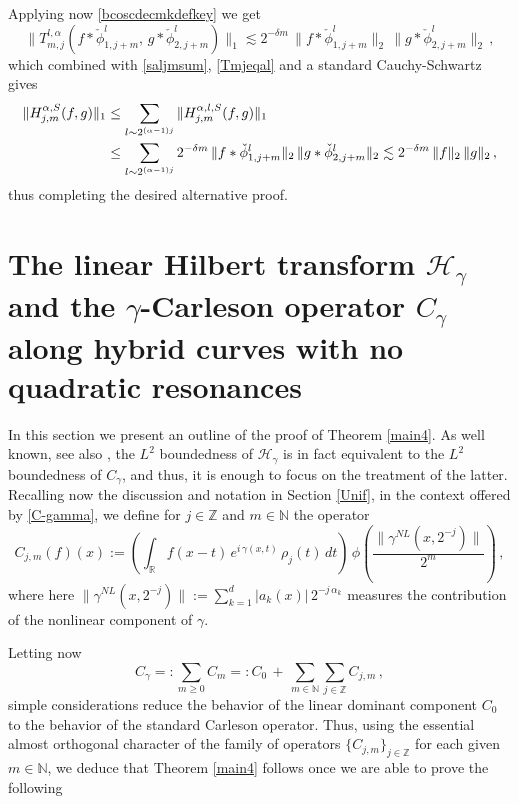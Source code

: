 \documentclass[a4paper,reqno]{amsart}
\numberwithin{equation}{section}
\theoremstyle{definition}
\newcommand{\R}{\mathbb{R}}
\newcommand{\Z}{\mathbb{Z}}
\newcommand{\N}{\mathbb{N}}
\def\a{\alpha}
\def\g{\gamma}
\def\H{\mathcal{H}}
\def\d{\delta}
\begin{document}
Applying now \eqref{bcoscdecmkdefkey} we get
\begin{equation}\label{Tmjeq1al}
\big\|T_{m,j}^{l,\a}(f*\check{\phi}_{1,j+m}^l,\,g*\check{\phi}_{2,j+m}^l)\big\|_1\lesssim 2^{-\d m}\,\|f*\check{\phi}_{1,j+m}^l\|_2\,\|g*\check{\phi}_{2,j+m}^l\|_2\,,
\end{equation}	
which combined with \eqref{saljmsum}, \eqref{Tmjeqal} and a standard Cauchy-Schwartz gives
\begin{align}
	\|H^{\a,S}_{j,m}(f,g)\|_1&\leq \sum_{l\sim 2^{(\a-1)j}}\|H^{\a,l,S}_{j,m}(f,g)\|_1\nonumber\\
	&\leq \sum_{l\sim 2^{(\a-1)j}}2^{-\d m}\,\|f*\check{\phi}_{1,j+m}^l\|_2\,\|g*\check{\phi}_{2,j+m}^l\|_2\lesssim
	2^{-\d m}\,\|f\|_2\,\|g\|_2\,, \raisetag{.5\baselineskip}\label{comclal}
\end{align}
thus completing the desired alternative proof.


\section{The linear Hilbert transform $\H_{\g}$ and the $\g$-Carleson operator $C_{\g}$ along hybrid curves with no quadratic resonances}\label{Hywithout}


In this section we present an outline of the proof of Theorem \ref{main4}. As well known, see also \cite{Lie19}, the $L^2$  boundedness of $\H_{\g}$ is in fact equivalent to the $L^2$ boundedness of $C_{\g}$, and thus, it is enough to focus on the treatment of the latter. Recalling now the discussion and notation in Section \ref{Unif}, in the context offered by \eqref{C-gamma}, we define for $j\in\Z$ and $m\in\N$ the operator
\begin{equation}\label{C-gammajm}
		C_{j,m}(f)(x):=\left(\int_{\R} f(x-t)\,e^{i\,\g(x,t)}\,\rho_j(t)\,dt\right)\,\phi\left(\frac{\|\g^{NL}(x,2^{-j})\|}{2^m}\right)\,,
\end{equation}
where here $\|\g^{NL}(x,2^{-j})\|:=\sum_{k=1}^d |a_k(x)|\,2^{-j\,\a_k}$ measures the contribution of the nonlinear component of $\g$.

Letting now
\begin{equation}\label{C-gammadec}
	C_{\g}=:\sum_{m\geq 0}C_{m}=:C_0\,+\,\sum_{m\in\N}\sum_{j\in\Z} C_{j,m}\,,
\end{equation}
simple considerations reduce the behavior of the linear dominant component $C_0$ to the behavior of the standard Carleson operator. Thus, using the essential almost orthogonal character of the family of operators $\{C_{j,m}\}_{j\in\Z}$ for each given $m\in\N$, we deduce that Theorem \ref{main4} follows once we are able to prove the following
\end{document}
